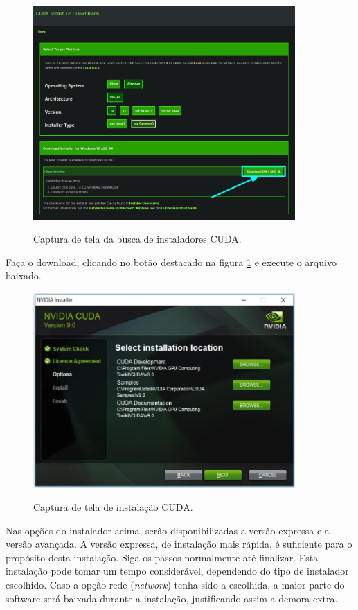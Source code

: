 \begin{figure}[H]
    \centering
    \caption{Captura de tela da busca de instaladores CUDA.}
    \includegraphics[width=10cm]{fig/cuda_download_page_final.png}
    \label{fig:fig27}
\end{figure}

Faça o download, clicando no botão destacado na figura \ref{fig:fig27} e execute o arquivo baixado.

\begin{figure}[H]
    \centering
    \caption{Captura de tela de instalação CUDA.}
    \includegraphics[width=10cm]{fig/cuda_instalacao.png}
    \label{fig:fig28}
\end{figure}

Nas opções do instalador acima, serão disponibilizadas a versão expressa e a versão avançada. A versão expressa, de instalação mais rápida, é suficiente para o propósito desta instalação. Siga os passos normalmente até finalizar. Esta instalação pode tomar um tempo considerável, dependendo do tipo de instalador escolhido. Caso a opção rede (\textit{network}) tenha sido a escolhida, a maior parte do software será baixada durante a instalação, justificando assim a demora extra.

